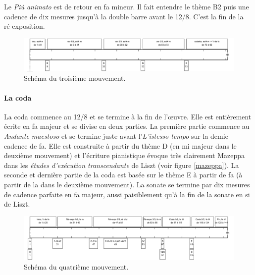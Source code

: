 Le \emph{Più animato} est de retour en fa mineur. Il fait entendre le thème B2 puis une cadence de dix mesures jusqu'à la double barre avant le 12/8. C'est la fin de la ré-exposition.

\begin{figure}[!ht]
  \begin{bigcenter}
    \includegraphics[width=15cm, keepaspectratio]{frise-mvt3.png}
  \end{bigcenter}
  \caption{\label{schema-3}Schéma du troisième mouvement.}
\end{figure}

\paragraph{La coda}

La coda commence au 12/8 et se termine à la fin de l'œuvre. Elle est entièrement écrite en fa majeur et se divise en deux parties. La première partie commence au \emph{Andante maestoso} et se termine juste avant l'\emph{L'istesso tempo} sur la demie-cadence de fa. Elle est construite à partir du thème D (en mi majeur dans le deuxième mouvement) et l'écriture pianistique évoque très clairement Mazeppa dans les \emph{études d'exécution transcendante} de Liszt (voir figure \ref{mazeppa}). La seconde et dernière partie de la coda est basée sur le thème E à partir de fa (à partir de la dans le deuxième mouvement). La sonate se termine par dix mesures de cadence parfaite en fa majeur, aussi paisiblement qu'à la fin de la sonate en si de Liszt.

\begin{figure}[!ht]
  \begin{bigcenter}
    \includegraphics[width=15cm, keepaspectratio]{frise-mvt4.png}
  \end{bigcenter}
  \caption{\label{schema-4}Schéma du quatrième mouvement.}
\end{figure}

